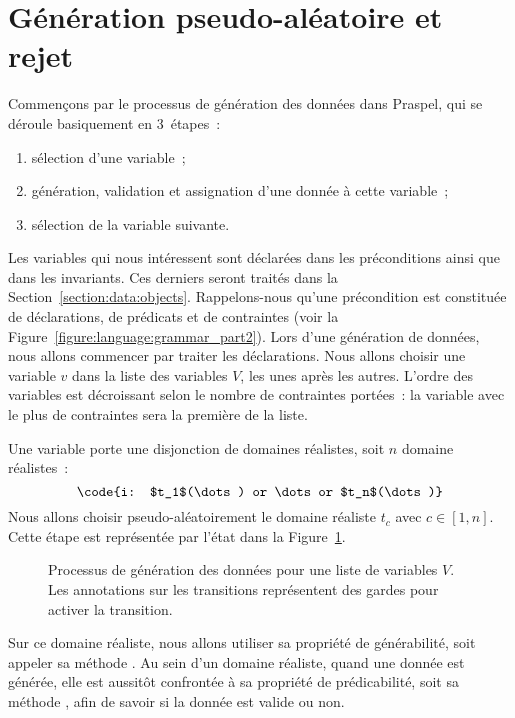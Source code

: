\section{Génération pseudo-aléatoire et rejet}
\label{section:data:random}

Commençons par le processus de génération des données dans Praspel, qui se
déroule basiquement en 3~étapes~:

\begin{enumerate}

\item sélection d'une variable~;

\item génération, validation et assignation d'une donnée à cette variable~;

\item sélection de la variable suivante.

\end{enumerate}

Les variables qui nous intéressent sont déclarées dans les préconditions ainsi
que dans les invariants. Ces derniers seront traités dans la
Section~\ref{section:data:objects}. Rappelons-nous qu'une précondition est
constituée de déclarations, de prédicats et de contraintes (voir la
Figure~\ref{figure:language:grammar_part2}). Lors d'une génération de données,
nous allons commencer par traiter les déclarations. Nous allons choisir une
variable $v$ dans la liste des variables $V$, les unes après les autres.
L'ordre des variables est décroissant selon le nombre de contraintes portées~:
la variable avec le plus de contraintes sera la première de la liste.

Une variable porte une disjonction de domaines réalistes, soit $n$ domaine
réalistes~:
%
$$\code{i: $t_1$(\dots) or \dots or $t_n$(\dots)}$$
%
Nous allons choisir pseudo-aléatoirement le domaine réaliste $t_c$ avec $c \in
[1, n]$. Cette étape est représentée par l'état  dans la
Figure~\ref{figure:data:process}.
%
\begin{figure}


\caption{\label{figure:data:process} Processus de génération des données pour
une liste de variables $V$. Les annotations sur les transitions représentent des
gardes pour activer la transition.}

\end{figure}
%

Sur ce domaine réaliste, nous allons utiliser sa propriété de générabilité, soit
appeler sa méthode . Au sein d'un domaine réaliste, quand une
donnée est générée, elle est aussitôt confrontée à sa propriété de
prédicabilité, soit sa méthode , afin de savoir si la donnée est
valide ou non.

